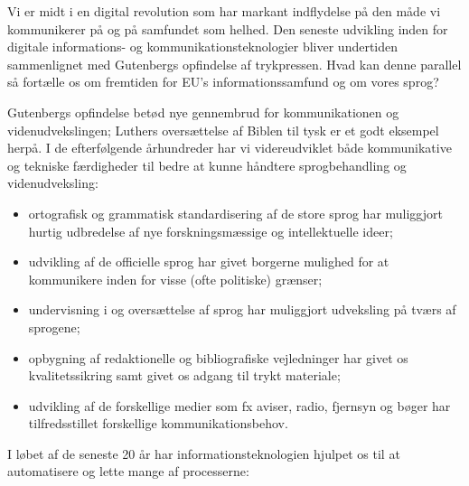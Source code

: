 \begin{multicols}{2}
\end{multicols}

\clearpage



\begin{multicols}{2}

Vi er midt i en digital revolution som har markant indflydelse \mbox{p\aa} den m\aa de vi kommunikerer \mbox{p\aa} og \mbox{p\aa} samfundet som helhed. Den seneste udvikling inden for digitale informations- og kommunikationsteknologier bliver undertiden sammenlignet med Gutenbergs opfindelse af trykpressen. Hvad kan denne parallel \mbox{s\aa} fort\ae lle os om fremtiden for EU's informationssamfund og om vores sprog?


Gutenbergs opfindelse bet\o d nye gennembrud for kommunikationen og videnudvekslingen; Luthers overs\ae ttelse af Biblen til tysk er et godt eksempel \mbox{herp\aa}. I de efterf\o lgende \aa rhundreder har vi videreudviklet b\aa de kommunikative og tekniske f\ae rdigheder til bedre at kunne h\aa ndtere sprogbehandling og videnudveksling: 

 \begin{itemize}
      \item ortografisk og grammatisk standardisering af de store sprog har muliggjort hurtig udbredelse af nye forskningsm\ae ssige og intellektuelle ideer;
      \item udvikling af de officielle sprog har givet borgerne mulighed for at kommunikere inden for visse (ofte politiske) gr\ae nser;
      \item undervisning i og overs\ae ttelse af sprog har muliggjort udveksling \mbox{p\aa} tv\ae rs af sprogene;
\item opbygning af redaktionelle og bibliografiske vejledninger har givet os kvalitetssikring samt givet os adgang til trykt materiale;
      \item udvikling af de forskellige medier som fx aviser, radio, fjernsyn og b\o ger har tilfredsstillet forskellige kommunikationsbehov.
    \end{itemize}

 I l\o bet af de seneste 20 \aa r har informationsteknologien hjulpet os til at automatisere og lette mange af processerne:


\end{multicols}
